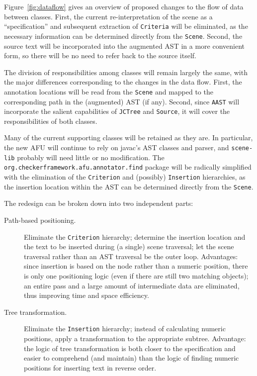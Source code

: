 \documentclass{article}
\begin{document}
Figure~\ref{fig:dataflow} gives an overview of proposed changes to the
flow of data between classes.  First, the current re-interpretation of
the scene as a ``specification'' and subsequent extraction of
\texttt{Criteria} will be eliminated, as the necessary information can
be determined directly from the \texttt{Scene}.  Second, the source text
will be incorporated into the augmented AST in a more convenient form,
so there will be no need to refer back to the source itself.

The division of responsibilities among classes will remain largely the
same, with the major differences corresponding to the changes in the
data flow.  First, the annotation locations will be read from the
\texttt{Scene} and mapped to the corresponding path in the (augmented)
AST (if any).  Second, since \texttt{AAST} will incorporate the salient
capabilities of \texttt{JCTree} and \texttt{Source}, it will cover the
responsibilities of both classes.

Many of the current supporting classes will be retained as they are.  In
particular, the new AFU will continue to rely on javac's AST classes and
parser, and \texttt{scene-lib} probably will need little or no
modification.  The \texttt{org.checkerframework.afu.annotator.find} package will be radically
simplified with the elimination of the \texttt{Criterion} and
(possibly) \texttt{Insertion} hierarchies, as the insertion location
within the AST can be determined directly from the \texttt{Scene}.

The redesign can be broken down into two independent parts:
\begin{description}
\item[Path-based positioning.] Eliminate the \texttt{Criterion}
hierarchy; determine the insertion location and the text to be inserted
during (a single) scene traversal; let the scene traversal rather than
an AST traversal be the outer loop.  Advantages: since insertion is
based on the node rather than a numeric position, there is only one
positioning logic (even if there are still two matching objects); an
entire pass and a large amount of intermediate data are eliminated, thus
improving time and space efficiency.
\item[Tree transformation.]  Eliminate the \texttt{Insertion} hierarchy;
instead of calculating numeric positions, apply a transformation to the
appropriate subtree.  Advantage: the logic of tree transformation is
both closer to the specification and easier to comprehend (and maintain)
than the logic of finding numeric positions for inserting text in
reverse order.
\end{description}
\end{document}
